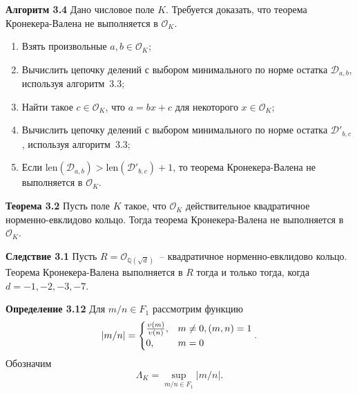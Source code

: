 \documentclass[_00_autoref.tex]{subfiles}
\begin{document}
\textbf{Алгоритм 3.4}\label{algorithm:kronecker_vahlen_common}
    Дано числовое поле $K$.
    Требуется доказать, что теорема Кронекера-Валена не выполняется в $\mathcal{O}_K$.
    
    \begin{enumerate}
        \item Взять произвольные $a, b \in \mathcal{O}_K$;

        \item Вычислить цепочку делений с выбором минимального по норме остатка $\mathcal{D}_{a, b}$, используя алгоритм~3.3;

        \item Найти такое $c \in \mathcal{O}_K$, что $a = bx + c$ для некоторого $x \in \mathcal{O}_K$;

        \item Вычислить цепочку делений с выбором минимального по норме остатка $\mathcal{D}'_{b,c}$, используя алгоритм~3.3;

        \item Если $\textrm{len}(\mathcal{D}_{a, b}) > \textrm{len}(\mathcal{D}'_{b, c}) + 1$, то теорема Кронекера-Валена не выполняется в $\mathcal{O}_K$.
    \end{enumerate}


\textbf{Теорема 3.2}\label{theorem:kronecker}
    Пусть поле $K$ такое, что $\mathcal{O}_K$ действительное квадратичное норменно-евклидово кольцо.
    Тогда теорема Кронекера-Валена не выполняется в $\mathcal{O}_K$.

\textbf{Следствие 3.1}
    Пусть $R = \mathcal{O}_{\mathbb{Q}(\sqrt{d})}$~-- квадратичное норменно-евклидово кольцо.
    Теорема Кронекера-Валена выполняется в $R$ тогда и только тогда, когда $d=-1, -2, -3, -7$.


\textbf{Определение 3.12}\label{definition:euclidean_lambda}
    Для $m/n \in F_1$ рассмотрим функцию
    \begin{equation*}
        |m/n| = \begin{cases}
            \frac{\upsilon(m)}{\upsilon(n)}, & m \neq 0, (m, n) = 1\\
            0, & m = 0
        \end{cases}.
    \end{equation*}
    Обозначим
    \begin{equation*}
        \Lambda_K = \sup_{m/n \in F_1} |m/n|.
    \end{equation*}
\end{document}
